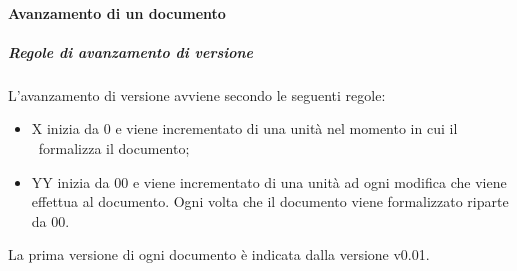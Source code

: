 \documentclass[../NormeProgetto.text]{subfiles}
\begin{document}
			\paragraph{Avanzamento di un documento} 
				\subparagraph{Regole di avanzamento di versione}
					L'avanzamento di versione avviene secondo le seguenti regole:
					\begin{itemize}
						\item X inizia da 0 e viene incrementato di una unità nel momento in cui il \responsabilediprogetto\ formalizza il documento;
						\item YY inizia da 00 e viene incrementato di una unità ad ogni modifica che viene effettua al documento. Ogni volta che il documento viene formalizzato riparte da 00.
					\end{itemize}
					La prima versione di ogni documento è indicata dalla versione v0.01.		
				
\end{document}
